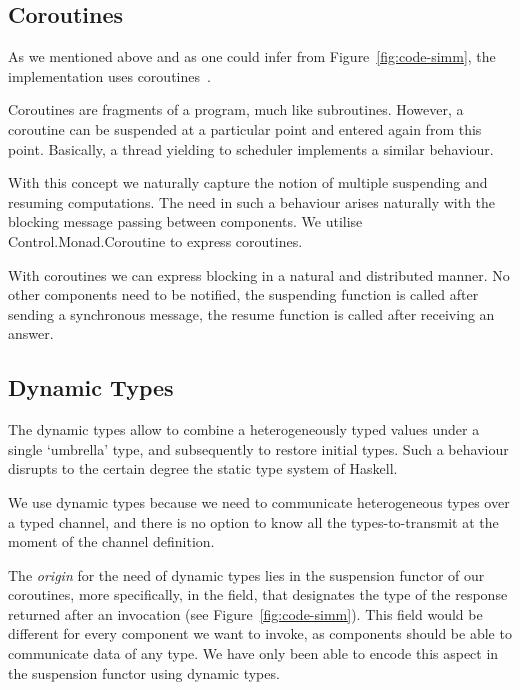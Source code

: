 \subsection{Coroutines}
\label{sec:impl-coroutines}
As we mentioned above and as one could infer from Figure~\ref{fig:code-simm}, the implementation uses coroutines~\cite{coroutines}.

Coroutines are fragments of a program, much like subroutines. 
However, a coroutine can be suspended at a particular point and entered again from this point. 
Basically, a thread yielding to scheduler implements a similar behaviour.

With this concept we naturally capture the notion of multiple suspending and resuming computations.
The need in such a behaviour arises naturally with the blocking message passing between components.
We utilise \textsf{Control.Monad.Coroutine} \cite{cmt} to express coroutines.

With coroutines we can express blocking in a natural and distributed manner.
No other components need to be notified, the suspending function is called after sending a synchronous message, the resume function is called after receiving an answer.

\subsection{Dynamic Types}
The dynamic types \cite{Abadi:1991:DTS:103135.103138} allow to combine
a heterogeneously typed values under a single `umbrella' type, and
subsequently to restore initial types. Such a behaviour disrupts to
the certain degree the static type system of Haskell.

We use dynamic types %
because 
we need to communicate heterogeneous types over a typed channel, and there is no option to know all the types-to-transmit at the moment of the channel definition.

The \emph{origin} for the need of dynamic types lies in the suspension functor of our coroutines, more specifically, in the  field, that designates the type of the response returned after an invocation (see Figure~\ref{fig:code-simm}).
This field would be different for every component we want to invoke, as components should be able to communicate data of any type. %
We have only been able to encode this aspect in the suspension functor using dynamic types.

